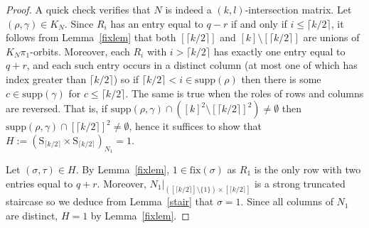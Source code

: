 \documentclass{daj}
\renewcommand\S{\mathrm{S}}
\newcommand\fix{\mathrm{fix}}
\newcommand\supp{\mathrm{supp}}
\theoremstyle{plain}
\theoremstyle{definition}
\begin{document}
\begin{proof}
A quick check verifies that $N$ is indeed a $(k,l)$-intersection matrix. Let $(\rho,\gamma)\in K_N$. Since $R_i$ has an entry equal to $q-r$ if and only if $i\leq \lceil k/2\rceil$, it follows from Lemma~\ref{fixlem} that both $[\lceil k/2\rceil ]$ and $[k]\setminus[\lceil k/2\rceil]$ are unions of $K_N\pi_1$-orbits. Moreover, each $R_i$ with $i>\lceil k/2\rceil$ has exactly one entry equal to $q+r$, and each such entry occurs in a distinct column (at most one of which has index greater than $\lceil k/2\rceil$) so if $\lceil k/2\rceil<i\in\supp(\rho)$ then there is some $c\in\supp(\gamma)$ for $c\leq \lceil k/2\rceil$. The same is true when the roles of rows and columns are reversed. That is, if $\supp(\rho,\gamma)\cap\left( [k]^2\setminus [\lceil k/2\rceil ]^2\right)\ne\emptyset$ then $\supp(\rho,\gamma)\cap[\lceil k/2\rceil ]^2\ne\emptyset$, hence it suffices to show that $H:=(\S_{\lceil k/2\rceil}\times\S_{\lceil k/2\rceil})_{N_1}=1$.

Let $(\sigma,\tau)\in H$. By Lemma~\ref{fixlem}, $1\in\fix(\sigma)$ as $R_1$ is the only row with two entries equal to $q+r$. Moreover, $N_1|_{([\lceil k/2\rceil]\setminus\{1\})\times [\lceil k/2\rceil]}$ is a strong truncated staircase so we deduce from Lemma~\ref{stair} that $\sigma=1$. Since all columns of $N_1$ are distinct, $H=1$ by Lemma~\ref{fixlem}.
\end{proof}
\end{document}

